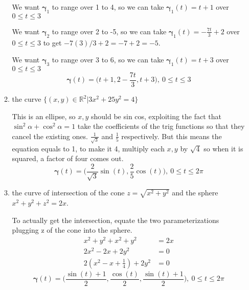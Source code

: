 \documentclass{article}
\begin{document}
\begin{enumerate}
\begin{enumerate}
        We want $\boldsymbol{\gamma}_1$ to range over 1 to 4, so we can take $\boldsymbol{\gamma}_1(t)= t+1$ over $0\leq t \leq 3$

        We want $\boldsymbol{\gamma}_2$ to range over 2 to -5, so we can take $\boldsymbol{\gamma}_1(t)= -\frac{7t}{3}+2$ over $0\leq t \leq 3$ to get $-7(3)/3 + 2 = -7 + 2 = -5$.

        We want $\boldsymbol{\gamma}_3$ to range over 3 to 6, so we can take $\boldsymbol{\gamma}_1(t)= t+3$ over $0\leq t \leq 3$
        \[ \boldsymbol{\gamma}(t) = \Big(t+1,2-\frac{7t}{3}, t+3 \Big),\: 0 \leq t \leq 3 \]
    \item the curve $\{(x,y)\in \mathbb{R}^2|3x^2+25y^2=4\}$
    
    This is an ellipse, so $x,y$ should be sin cos, exploiting the fact that $\sin^2 \alpha + \cos^2 \alpha = 1$ take the coefficients of the trig functions so that they cancel the existing ones. $\frac{1}{\sqrt{3}}$ and $\frac{1}{5}$ respectively. But this means the equation equals to 1, to make it 4, multiply each $x,y$ by $\sqrt{4}$ so when it is squared, a factor of four comes out.
        \[ \boldsymbol{\gamma}(t) = \Big(\frac{2}{\sqrt{3}} \sin(t), \frac{2}{5}\cos(t)\Big), \: 0 \leq t \leq 2\pi \]
    \item the curve of intersection of the cone $z=\sqrt{x^2 + y^2}$ and the sphere $x^2+y^2+z^2 = 2x$.
        
        To actually get the intersection, equate the two parameterizations plugging z of the cone into the sphere.
        \begin{align*}
            x^2 + y^2 + x^2 + y^2 &= 2x \\
            2x^2 - 2x +2y^2 &= 0 \\
            2(x^2 - x + \frac{1}{4}) +2y^2 &= 0
        \end{align*}
        \[ \boldsymbol{\gamma}(t) = \Big( \frac{\sin(t) + 1}{2}, \frac{\cos(t)}{2}, \frac{\sin(t) + 1}{2} \Big), \: 0 \leq t \leq 2\pi \]
\end{enumerate}


\end{enumerate}
\end{document}
